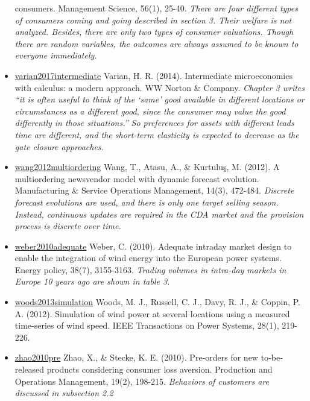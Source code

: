 \documentclass[letterpaper,8pt,twocolumn,twoside,]{pinp}
\begin{document}
\begin{itemize}
  consumers. Management Science, 56(1), 25-40. \emph{There are four
  different types of consumers coming and going described in section 3.
  Their welfare is not analyzed. Besides, there are only two types of
  consumer valuations. Though there are random variables, the outcomes
  are always assumed to be known to everyone immediately.}
\item
  \href{https://wwnorton.com/books/9780393689983/about-the-book/product-details}{varian2017intermediate}
  Varian, H. R. (2014). Intermediate microeconomics with calculus: a
  modern approach. WW Norton \& Company. \emph{Chapter 3 writes ``it is
  often useful to think of the `same' good available in different
  locations or circumstances as a different good, since the consumer may
  value the good differently in those situations.'' So preferences for
  assets with different leads time are different, and the short-term
  elasticity is expected to decrease as the gate closure approaches.}
\item
  \href{https://pubsonline.informs.org/doi/pdf/10.1287/msom.1120.0387}{wang2012multiordering}
  Wang, T., Atasu, A., \& Kurtuluş, M. (2012). A multiordering
  newsvendor model with dynamic forecast evolution. Manufacturing \&
  Service Operations Management, 14(3), 472-484. \emph{Discrete forecast
  evolutions are used, and there is only one target selling season.
  Instead, continuous updates are required in the CDA market and the
  provision process is discrete over time.}
\item
  \href{https://www.sciencedirect.com/science/article/pii/S0301421509005564}{weber2010adequate}
  Weber, C. (2010). Adequate intraday market design to enable the
  integration of wind energy into the European power systems. Energy
  policy, 38(7), 3155-3163. \emph{Trading volumes in intra-day markets
  in Europe 10 years ago are shown in table 3.}
\item
  \href{https://ieeexplore.ieee.org/document/6262462}{woods2013simulation}
  Woods, M. J., Russell, C. J., Davy, R. J., \& Coppin, P. A. (2012).
  Simulation of wind power at several locations using a measured
  time-series of wind speed. IEEE Transactions on Power Systems, 28(1),
  219-226.
\item
  \href{https://onlinelibrary.wiley.com/doi/abs/10.1111/j.1937-5956.2009.01092.x?casa_token=OFXPwPdWLU0AAAAA:5l-61h0Fl19UbgKSXoJEyS85zUGGyqK8-G6A4TImpG4StMJtsJKjokbC6r4jwvezceSVpybsbpqsZ8A}{zhao2010pre}
  Zhao, X., \& Stecke, K. E. (2010). Pre‐orders for new to‐be‐released
  products considering consumer loss aversion. Production and Operations
  Management, 19(2), 198-215. \emph{Behaviors of customers are discussed
  in subsection 2.2}
\end{itemize}

\end{document}
